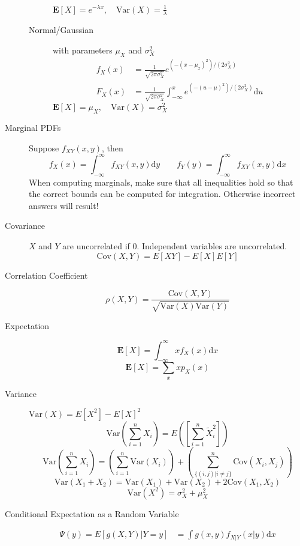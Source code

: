 \documentclass[8pt]{article}
\newcommand{\dd}[1]{\mathrm{d}{#1}}
\begin{document}
\begin{multicols}{2}
\begin{description}
\begin{description}
      $\mathbf{E}[X]=e^{-\lambda x},\quad\text{Var}(X)=\frac{1}{\lambda}$
    \item[Normal/Gaussian] with parameters $\mu_X$ and $\sigma_X^2$
      \begin{equation*}
        \begin{aligned}
          f_X(x) &=
          \frac{1}{\sqrt{2\pi\sigma_X^2}}e^{(-(x-\mu_x)^2)/(2\sigma_X^2)}
          \\
          F_X(x) &= \frac{1}{\sqrt{2\pi\sigma_X^2}} \int_{-\infty}^{x}
          e^{(-(u-\mu)^2)/(2\sigma_X^2)} \dd{u}
        \end{aligned}
    \end{equation*}
    $\mathbf{E}[X]=\mu_X,\quad\text{Var}(X)=\sigma_X^2$
  \end{description}
\item[Marginal PDFs] Suppose $f_{XY}(x,y)$, then
  $$f_X(x) = \int_{-\infty}^{\infty}f_{XY}(x,y)\dd{y} \quad\quad
  f_Y(y) = \int_{-\infty}^{\infty}f_{XY}(x,y)\dd{x}$$ When computing
  marginals, make sure that all inequalities hold so that the correct
  bounds can be computed for integration. Otherwise incorrect answers
  will result!
\item[Covariance] $X$ and $Y$ are uncorrelated if 0. Independent
  variables are uncorrelated.
  $$\text{Cov}(X,Y)=E[XY]-E[X]E[Y]$$
\item[Correlation Coefficient]
  $$\rho(X,Y)=\frac{\text{Cov}(X,Y)}{\sqrt{\text{Var}(X)\text{Var}(Y)}}$$
\item[Expectation] $$\mathbf{E}[X] = \int_{-\infty}^{\infty} x f_X(x)
  \dd{x}$$
  $$\mathbf{E}[X] = \sum_x x p_X(x)$$
\item[Variance] $\text{Var}(X) = E[X^2] - E[X]^2$
  $$\text{Var}\left(\sum_{i=1}^{n}X_i\right) =
  E\left(\left[\sum_{i=1}^{n}\tilde{X}_i^2\right]\right)$$
  $$\text{Var}\left(\sum_{i=1}^{n}X_i\right) =
  \left(\sum_{i=1}^{n}\text{Var}(X_i)\right) + \left(\sum_{\{(i,j) |
      i\not= j\}}^{n}\text{Cov}(X_i, X_j)\right)$$
  $$\text{Var}(X_1 + X_2) = \text{Var}(X_1) + \text{Var}(X_2) +
  2\text{Cov}(X_1,X_2)$$
  $$\text{Var}(X^2) = \sigma_X^2 + \mu_X^2$$
\item[Conditional Expectation as a Random Variable]
  \begin{equation*}
    \begin{aligned}
      \Psi(y) = E[g(X,Y)|Y=y] &= \int g(x,y) f_{X|Y}(x|y) \dd{x} \\

\end{aligned}
\end{equation*}
\end{description}
\end{multicols}
\end{document}

